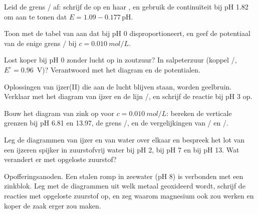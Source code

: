\begin{exercise}[$\star\star$]\label{exo:b1:e-ph-diagrams:6}
Leid de grens / af: schrijf de  op en
haar , en gebruik de continuïteit bij pH 1.82 om
aan te tonen dat $E = 1.09 -
0.177\,\mathrm{pH}$.
\end{exercise}

\begin{exercise}[$\star\star$]\label{exo:b1:e-ph-diagrams:7}
Toon met de tabel van  aan dat  bij pH 0
disproportioneert, en geef de potentiaal van de enige grens
/ bij $c = \qty{0.010}{mol/L}$.
\end{exercise}

\begin{exercise}[$\star\star$]\label{exo:b1:e-ph-diagrams:8}
Lost koper bij pH 0 zonder lucht op in zoutzuur? In salpeterzuur
(koppel /, $E^\circ = 0.96$~V)? Verantwoord met het
diagram en de potentialen.
\end{exercise}

\begin{exercise}[$\star\star$]\label{exo:b1:e-ph-diagrams:9}
Oplossingen van ijzer(II) die aan de lucht blijven staan, worden
geelbruin. Verklaar met het diagram van ijzer en de lijn
/, en schrijf de reactie bij pH 3 op.
\end{exercise}

\begin{exercise}[$\star\star\star$]\label{exo:b1:e-ph-diagrams:10}
Bouw het diagram van zink op voor $c = \qty{0.010}{mol/L}$: bereken de
verticale grenzen bij pH 6.81 en 13.97, de grens /, en
de vergelijkingen van / en /.
\end{exercise}

\begin{exercise}[$\star\star\star$]\label{exo:b1:e-ph-diagrams:11}
Leg de diagrammen van ijzer en van water over elkaar en bespreek het lot
van een ijzeren spijker in zuurstofvrij water bij pH 2, bij pH 7 en bij
pH 13. Wat verandert er met opgeloste zuurstof?
\end{exercise}

\begin{exercise}[$\star\star\star$]\label{exo:b1:e-ph-diagrams:12}
Opofferingsanoden. Een stalen romp in zeewater (pH 8) is verbonden met
een zinkblok. Leg met de diagrammen uit welk metaal geoxideerd wordt,
schrijf de reacties met opgeloste zuurstof op, en zeg waarom magnesium
ook zou werken en koper de zaak erger zou maken.
\end{exercise}

